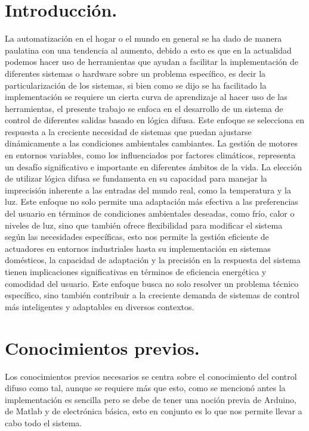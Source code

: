 \documentclass[a4paper, 12pt]{article}
\begin{document}
    \section{Introducción.}
    La automatización en el hogar o el mundo en general se ha dado de manera paulatina con una tendencia al aumento, debido a esto es que en la actualidad podemos hacer uso de herramientas que ayudan a facilitar la implementación de diferentes sistemas o hardware sobre un problema específico, es decir la particularización de los sistemas, si bien como se dijo se ha facilitado la implementación se requiere un cierta curva de aprendizaje al hacer uso de las herramientas, el presente trabajo se enfoca en el desarrollo de un sistema de control de diferentes salidas basado en lógica difusa. Este enfoque se selecciona en respuesta a la creciente necesidad de sistemas que puedan ajustarse dinámicamente a las condiciones ambientales cambiantes.
    La gestión de motores en entornos variables, como los influenciados por factores climáticos, representa un desafío significativo e importante en diferentes ámbitos de la vida. La elección de utilizar lógica difusa se fundamenta en su capacidad para manejar la imprecisión inherente a las entradas del mundo real, como la temperatura y la luz. Este enfoque no solo permite una adaptación más efectiva a las preferencias del usuario en términos de condiciones ambientales deseadas, como frío, calor o niveles de luz, sino que también ofrece flexibilidad para modificar el sistema según las necesidades específicas, esto nos permite la gestión eficiente de actuadores en entornos industriales hasta su implementación en sistemas domésticos, la capacidad de adaptación y la precisión en la respuesta del sistema tienen implicaciones significativas en términos de eficiencia energética y comodidad del usuario. Este enfoque busca no solo resolver un problema técnico específico, sino también contribuir a la creciente demanda de sistemas de control más inteligentes y adaptables en diversos contextos.

    \section{Conocimientos previos.}
    Los conocimientos previos necesarios se centra sobre el conocimiento del control difuso como tal, aunque se requiere más que esto, como se mencionó antes la implementación es sencilla pero se debe de tener una noción previa de Arduino, de Matlab y de electrónica básica, esto en conjunto es lo que nos permite llevar  a cabo todo el sistema.
\end{document}
